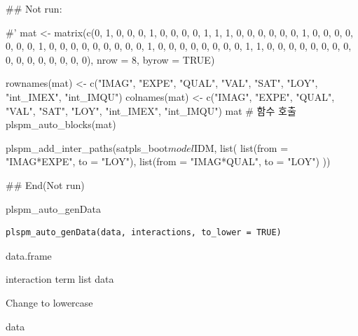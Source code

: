 \documentclass[a4paper]{book}
\begin{document}
\begin{Examples}
\begin{ExampleCode}


\#\# Not run: 

#'
mat <- matrix(c(0, 1, 0, 0, 0, 1, 0, 0,
                0, 0, 1, 1, 1, 0, 0, 0,
                0, 0, 0, 1, 0, 0, 0, 0,
                0, 0, 0, 1, 0, 0, 0, 0,
                0, 0, 0, 0, 0, 1, 0, 0,
                0, 0, 0, 0, 0, 0, 1, 1,
                0, 0, 0, 0, 0, 0, 0, 0,
                0, 0, 0, 0, 0, 0, 0, 0),
              nrow = 8, byrow = TRUE)

rownames(mat) <- c("IMAG", "EXPE", "QUAL", "VAL", "SAT", "LOY", "int_IMEX", "int_IMQU")
colnames(mat) <- c("IMAG", "EXPE", "QUAL", "VAL", "SAT", "LOY", "int_IMEX", "int_IMQU")
mat
# 함수 호출
plspm_auto_blocks(mat)

plspm_add_inter_paths(satpls_boot$model$IDM, list(
  list(from = "IMAG*EXPE", to = "LOY"),
  list(from = "IMAG*QUAL", to = "LOY")
))%


## End(Not run)

\end{ExampleCode}
\end{Examples}
%
\begin{Description}
plspm\_auto\_genData
\end{Description}
%
\begin{Usage}
\begin{verbatim}
plspm_auto_genData(data, interactions, to_lower = TRUE)
\end{verbatim}
\end{Usage}
%
\begin{Arguments}
\begin{ldescription}
\item[\code{data}] data.frame

\item[\code{interactions}] interaction term list data

\item[\code{to\_lower}] Change to lowercase
\end{ldescription}
\end{Arguments}
%
\begin{Value}
data
\end{Value}
%
\end{document}
